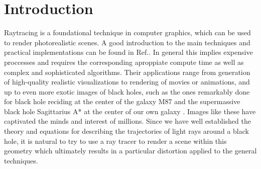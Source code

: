


\section{Introduction}
\label{sec:intro}



Raytracing is a foundational technique in computer graphics, which can be used
to render photorealistic scenes.
A good introduction to the main techniques and practical implementations can be found
in Ref.\cite{raytracing_in_one_weekend}.
In general this implies expensive proccesses and requires the corresponding aproppiate compute time
as well as complex and sophisticated algorithms.
Their applications range from generation of high-quality realistic visualizations to
rendering of movies or animations, and up to even more exotic images of black holes,
such as the ones remarkably done for black hole reciding at the center of the galaxy M87 \cite{M87_EHT_i}
and the supermassive black hole Sagittarius A* at the center of our own galaxy \cite{SagA_EHT_i}. Images like these have captivated the minds and interest of millions. 
Since we have well established the theory and equations for describing the trajectories of light rays around a black hole, it is natural to try to use a ray tracer to render a scene within this geometry which ultimately results in a particular distortion applied to the general techniques.

